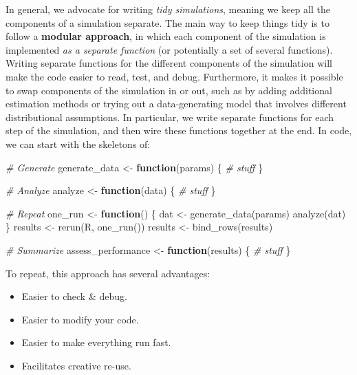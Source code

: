 \documentclass[
]{book}
\newenvironment{Shaded}{\begin{snugshade}}{\end{snugshade}}
\newcommand{\CommentTok}[1]{\textcolor[rgb]{0.56,0.35,0.01}{\textit{#1}}}
\newcommand{\ControlFlowTok}[1]{\textcolor[rgb]{0.13,0.29,0.53}{\textbf{#1}}}
\newcommand{\FunctionTok}[1]{\textcolor[rgb]{0.00,0.00,0.00}{#1}}
\newcommand{\NormalTok}[1]{#1}
\newcommand{\OtherTok}[1]{\textcolor[rgb]{0.56,0.35,0.01}{#1}}
\begin{document}
In general, we advocate for writing \emph{tidy simulations}, meaning we keep all the components of a simulation separate.
The main way to keep things tidy is to follow a \textbf{modular approach}, in which each component of the simulation is implemented \emph{as a separate function} (or potentially a set of several functions).
Writing separate functions for the different components of the simulation will make the code easier to read, test, and debug.
Furthermore, it makes it possible to swap components of the simulation in or out, such as by adding additional estimation methods or trying out a data-generating model that involves different distributional assumptions.
In particular, we write separate functions for each step of the simulation, and then wire these functions together at the end.
In code, we can start with the skeletons of:

\begin{Shaded}
\begin{Highlighting}[]
\CommentTok{\# Generate}
\NormalTok{generate\_data }\OtherTok{\textless{}{-}} \ControlFlowTok{function}\NormalTok{(params) \{}
  \CommentTok{\# stuff}
\NormalTok{\}}

\CommentTok{\# Analyze}
\NormalTok{analyze }\OtherTok{\textless{}{-}} \ControlFlowTok{function}\NormalTok{(data) \{}
  \CommentTok{\# stuff}
\NormalTok{\}}

\CommentTok{\# Repeat}
\NormalTok{one\_run }\OtherTok{\textless{}{-}} \ControlFlowTok{function}\NormalTok{() \{}
\NormalTok{  dat }\OtherTok{\textless{}{-}} \FunctionTok{generate\_data}\NormalTok{(params)}
  \FunctionTok{analyze}\NormalTok{(dat)}
\NormalTok{\}}
\NormalTok{results }\OtherTok{\textless{}{-}} \FunctionTok{rerun}\NormalTok{(R, }\FunctionTok{one\_run}\NormalTok{())}
\NormalTok{results }\OtherTok{\textless{}{-}} \FunctionTok{bind\_rows}\NormalTok{(results)}

\CommentTok{\# Summarize}
\NormalTok{assess\_performance }\OtherTok{\textless{}{-}} \ControlFlowTok{function}\NormalTok{(results) \{}
  \CommentTok{\# stuff}
\NormalTok{\}}
\end{Highlighting}
\end{Shaded}

To repeat, this approach has several advantages:

\begin{itemize}
\item
  Easier to check \& debug.
\item
  Easier to modify your code.
\item
  Easier to make everything run fast.
\item
  Facilitates creative re-use.
\end{itemize}
\end{document}
